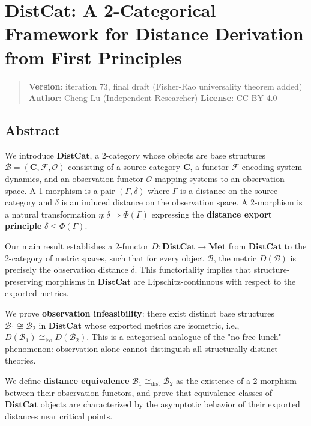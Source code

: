 \documentclass[
]{article}
\author{}
\date{}
\begin{document}
\section{DistCat: A 2-Categorical Framework for Distance Derivation from
First
Principles}\label{distcat-a-2-categorical-framework-for-distance-derivation-from-first-principles}

\begin{quote}
\textbf{Version}: iteration 73, final draft (Fisher-Rao universality
theorem added) \textbf{Author}: Cheng Lu (Independent Researcher)
\textbf{License}: CC BY 4.0
\end{quote}

\subsection{Abstract}\label{abstract}

We introduce \(\mathbf{DistCat}\), a 2-category whose objects are base
structures \(\mathcal{B}=(\mathbf{C},\mathcal{F},\mathcal{O})\) consisting of a source category \(\mathbf{C}\), a functor \(\mathcal{F}\)
encoding system dynamics, and an observation functor \(\mathcal{O}\) mapping
systems to an observation space. A 1-morphism is a pair \((\Gamma, \delta)\) where
\(\Gamma\) is a distance on the source category and \(\delta\) is an
induced distance on the observation space. A 2-morphism is a natural
transformation \(\eta: \delta \Rightarrow \Phi(\Gamma)\) expressing the
\textbf{distance export principle} \(\delta \leq \Phi(\Gamma)\).

Our main result establishes a 2-functor
\(D: \mathbf{DistCat} \to \mathbf{Met}\) from \(\mathbf{DistCat}\) to the
2-category of metric spaces, such that for every object
\(\mathcal{B}\), the metric \(D(\mathcal{B})\) is precisely the
observation distance \(\delta\). This functoriality implies that
structure-preserving morphisms in \(\mathbf{DistCat}\) are
Lipschitz-continuous with respect to the exported metrics.

We prove \textbf{observation infeasibility}: there exist
distinct base structures \(\mathcal{B}_1 \not\cong \mathcal{B}_2\) in
\(\mathbf{DistCat}\) whose exported metrics are isometric, i.e.,
\(D(\mathcal{B}_1) \cong_{\text{iso}} D(\mathcal{B}_2)\). This is a
categorical analogue of the "no free lunch" phenomenon: observation
alone cannot distinguish all structurally distinct theories.

We define \textbf{distance equivalence} \(\mathcal{B}_1 \cong_{\text{dist}}
\mathcal{B}_2\) as the existence of a 2-morphism between their
observation functors, and prove that equivalence classes of
\(\mathbf{DistCat}\) objects are characterized by the asymptotic behavior
of their exported distances near critical points.
\end{document}

